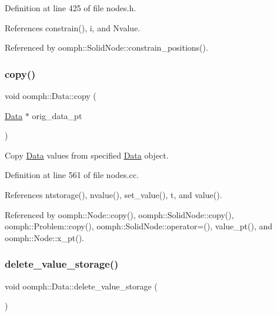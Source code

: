 Definition at line 425 of file nodes.\+h.



References constrain(), i, and Nvalue.



Referenced by oomph\+::\+Solid\+Node\+::constrain\+\_\+positions().

\mbox{\label{classoomph_1_1Data_a57889a9db7ca009434f0268173fcf3f8}} 
\subsubsection{\texorpdfstring{copy()}{copy()}}
{\footnotesize\ttfamily void oomph\+::\+Data\+::copy (\begin{DoxyParamCaption}\item[{\hyperlink{classoomph_1_1Data}{Data} $\ast$}]{orig\+\_\+data\+\_\+pt }\end{DoxyParamCaption})}



Copy \hyperlink{classoomph_1_1Data}{Data} values from specified \hyperlink{classoomph_1_1Data}{Data} object. 



Definition at line 561 of file nodes.\+cc.



References ntstorage(), nvalue(), set\+\_\+value(), t, and value().



Referenced by oomph\+::\+Node\+::copy(), oomph\+::\+Solid\+Node\+::copy(), oomph\+::\+Problem\+::copy(), oomph\+::\+Solid\+Node\+::operator=(), value\+\_\+pt(), and oomph\+::\+Node\+::x\+\_\+pt().

\mbox{\label{classoomph_1_1Data_ac5e1189e9f12749545ab95d560968aee}} 
\subsubsection{\texorpdfstring{delete\+\_\+value\+\_\+storage()}{delete\_value\_storage()}}
{\footnotesize\ttfamily void oomph\+::\+Data\+::delete\+\_\+value\+\_\+storage (\begin{DoxyParamCaption}{ }\end{DoxyParamCaption})\hspace{0.3cm}{\ttfamily [private]}}



